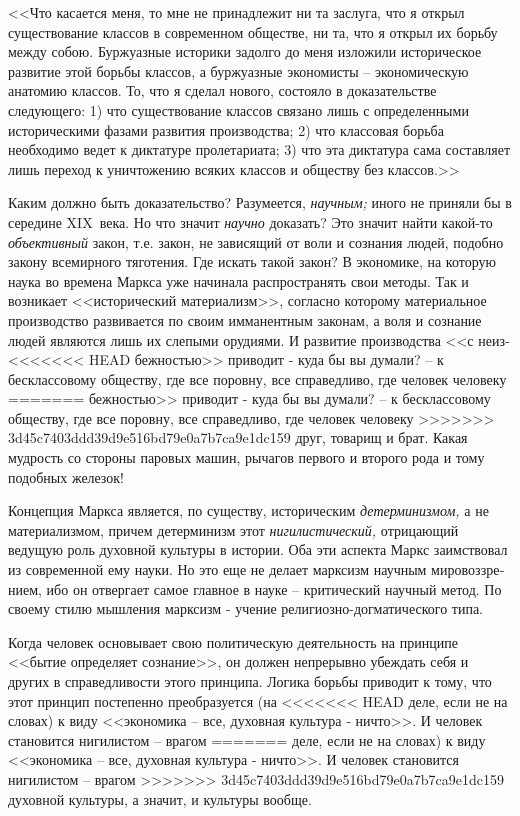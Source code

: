 \documentclass{book}
\begin{document}
<<Что касается меня, то мне не принадлежит ни та заслуга, что я открыл существование классов в современном обществе, ни та, что я 
открыл их борьбу между собою. Буржуазные историки задолго до меня изложили историческое развитие этой борьбы классов, а 
буржуазные экономисты -- экономическую анатомию классов. То, что я сделал нового, состояло в доказательстве следующего: 1) что 
существование классов связано лишь с определенными историческими фазами развития производства; 2) что классовая борьба 
необходимо ведет к диктатуре пролета­риата; 3) что эта диктатура сама составляет лишь переход к уничтожению всяких классов и 
обществу без классов.>>

Каким должно быть доказательство? Разумеется, \textit{научным;} иного не приняли бы в середине XIX~века. Но что значит 
\textit{научно} доказать?  Это значит найти какой-то \textit{объективный}  закон, т.е. закон, не зависящий от воли и сознания 
людей, подобно закону всемирного тяготения. Где искать такой закон? В экономике, на которую наука во времена Маркса уже начинала 
распространять свои методы. Так и возникает <<исторический материализм>>, со­гласно которому материальное производство развивается 
по своим имманентным законам, а воля и сознание людей являются лишь их слепыми орудиями. И развитие производства <<с неиз­
<<<<<<< HEAD
бежностью>> приводит ‑ куда бы вы думали? -- к бесклассовому обществу, где все поровну, все справедливо, где человек челове­ку 
=======
бежностью>> приводит - куда бы вы думали? -- к бесклассовому обществу, где все поровну, все справедливо, где человек челове­ку 
>>>>>>> 3d45c7403ddd39d9e516bd79e0a7b7ca9e1dc159
друг, товарищ и брат. Какая мудрость со стороны паровых машин, рычагов первого и второго рода и тому подобных желе­зок!

Концепция Маркса является, по существу, историческим \textit{детерминизмом,}  а не материализмом, причем детерминизм этот 
\textit{нигилистический,}  отрицающий ведущую роль духовной культуры в истории. Оба эти аспекта Маркс заимствовал из современной 
ему науки. Но это еще не делает марксизм научным мировоззре­нием, ибо он отвергает самое главное в науке -- критический научный 
метод. По своему стилю мышления марксизм - учение религиозно-догматического типа.

Когда человек основывает свою политическую деятельность на принципе <<бытие определяет сознание>>, он должен непрерывно убеждать 
себя и других в справедливости этого принципа. Логика борьбы приводит к тому, что этот принцип постепенно преобразуется (на 
<<<<<<< HEAD
деле, если не на словах) к виду <<экономика -- все, духовная культура ‑ ничто>>. И человек становится нигилистом -- врагом 
=======
деле, если не на словах) к виду <<экономика -- все, духовная культура - ничто>>. И человек становится нигилистом -- врагом 
>>>>>>> 3d45c7403ddd39d9e516bd79e0a7b7ca9e1dc159
духовной культуры, а значит, и культуры вообще.
\end{document}
